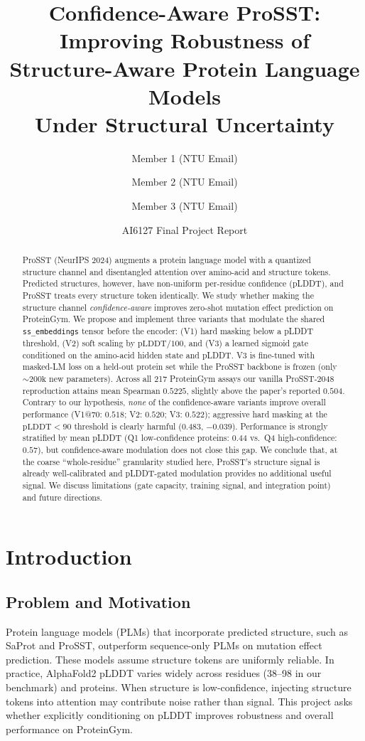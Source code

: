 \documentclass[11pt,a4paper]{article}
\title{Confidence-Aware ProSST: Improving Robustness of\\Structure-Aware Protein Language Models\\Under Structural Uncertainty}
\author{
    Member 1 (NTU Email) \and
    Member 2 (NTU Email) \and
    Member 3 (NTU Email)
}
\date{AI6127 Final Project Report}
\begin{document}
\maketitle

\begin{abstract}
ProSST (NeurIPS 2024) augments a protein language model with a quantized
structure channel and disentangled attention over amino-acid and structure
tokens. Predicted structures, however, have non-uniform per-residue confidence
(pLDDT), and ProSST treats every structure token identically. We study
whether making the structure channel \emph{confidence-aware} improves zero-shot
mutation effect prediction on ProteinGym. We propose and implement three
variants that modulate the shared \texttt{ss\_embeddings} tensor before the
encoder: (V1) hard masking below a pLDDT threshold, (V2) soft scaling by
$\text{pLDDT}/100$, and (V3) a learned sigmoid gate conditioned on the
amino-acid hidden state and pLDDT. V3 is fine-tuned with masked-LM loss on a
held-out protein set while the ProSST backbone is frozen (only
${\sim}\!200\text{k}$ new parameters). Across all 217 ProteinGym assays our
vanilla ProSST-2048 reproduction attains mean Spearman $0.5225$, slightly
above the paper's reported $0.504$. Contrary to our hypothesis,
\emph{none} of the confidence-aware variants improve overall performance
(V1@70: $0.518$; V2: $0.520$; V3: $0.522$); aggressive hard masking at the
$\text{pLDDT}{<}90$ threshold is clearly harmful ($0.483$, $-0.039$).
Performance is strongly stratified by mean pLDDT (Q1 low-confidence proteins:
$0.44$ vs.\ Q4 high-confidence: $0.57$), but confidence-aware modulation does
not close this gap. We conclude that, at the coarse ``whole-residue''
granularity studied here, ProSST's structure signal is already well-calibrated
and pLDDT-gated modulation provides no additional useful signal. We discuss
limitations (gate capacity, training signal, and integration point) and
future directions.
\end{abstract}

\section{Introduction}

\subsection{Problem and Motivation}
Protein language models (PLMs) that incorporate predicted structure, such as
SaProt and ProSST, outperform sequence-only PLMs on mutation effect
prediction. These models assume structure tokens are uniformly reliable.
In practice, AlphaFold2 pLDDT varies widely across residues (38--98 in our
benchmark) and proteins. When structure is low-confidence, injecting
structure tokens into attention may contribute noise rather than signal.
This project asks whether explicitly conditioning on pLDDT improves
robustness and overall performance on ProteinGym.
\end{document}
